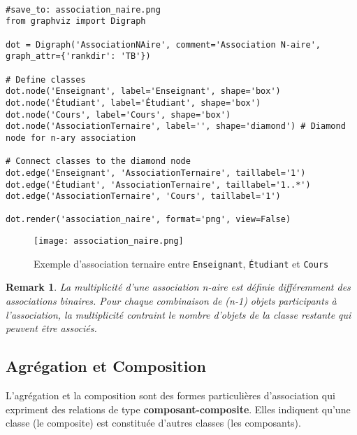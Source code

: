 \documentclass{article}
\newtheorem{remark}{Remark}
\begin{document}
\begin{verbatim}

#save_to: association_naire.png
from graphviz import Digraph

dot = Digraph('AssociationNAire', comment='Association N-aire', graph_attr={'rankdir': 'TB'})

# Define classes
dot.node('Enseignant', label='Enseignant', shape='box')
dot.node('Étudiant', label='Étudiant', shape='box')
dot.node('Cours', label='Cours', shape='box')
dot.node('AssociationTernaire', label='', shape='diamond') # Diamond node for n-ary association

# Connect classes to the diamond node
dot.edge('Enseignant', 'AssociationTernaire', taillabel='1')
dot.edge('Étudiant', 'AssociationTernaire', taillabel='1..*')
dot.edge('AssociationTernaire', 'Cours', taillabel='1')

dot.render('association_naire', format='png', view=False)
\end{verbatim}

\begin{figure}[h]
    \centering
    \texttt{[image: association\_naire.png]}
    \caption{Exemple d'association ternaire entre \texttt{Enseignant}, \texttt{Étudiant} et \texttt{Cours}}
    \label{fig:association_naire}
\end{figure}

\begin{remark}
La multiplicité d'une association n-aire est définie différemment des associations binaires. Pour chaque combinaison de (n-1) objets participants à l'association, la multiplicité contraint le nombre d'objets de la classe restante qui peuvent être associés.
\end{remark}


\subsection{Agrégation et Composition}

L'agrégation et la composition sont des formes particulières d'association qui expriment des relations de type \textbf{composant-composite}. Elles indiquent qu'une classe (le composite) est constituée d'autres classes (les composants).
\end{document}
